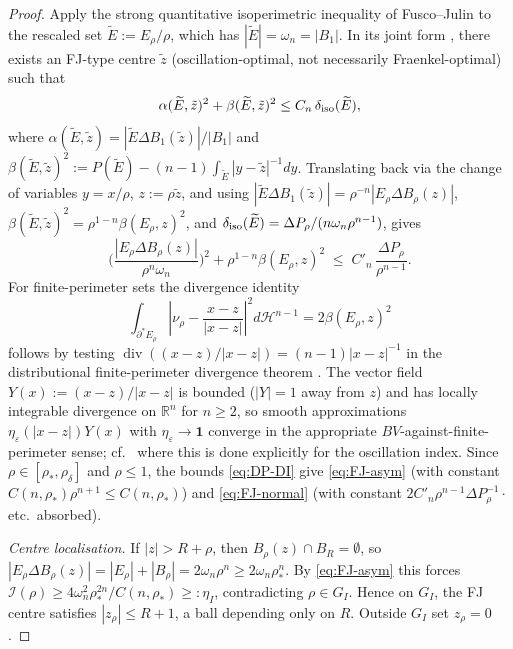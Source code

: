 \documentclass[11pt]{article}
\theoremstyle{definition}
\newcommand{\R}{\mathbb{R}}
\newcommand{\eps}{\varepsilon}
\newcommand{\rstar}{\rho_{*}}
\begin{document}
\begin{proof}
Apply the strong quantitative isoperimetric inequality of Fusco--Julin
\cite{FJ2014} to the rescaled set $\widetilde E:=E_\rho/\rho$, which
has $|\widetilde E|=\omega_n=|B_1|$.  In its joint form \cite[Thm.~1.1]{FJ2014},
there exists an FJ-type centre $\tilde z$ (oscillation-optimal, not
necessarily Fraenkel-optimal) such that
\[
   \alpha(\widetilde E,\tilde z)^2+\beta(\widetilde E,\tilde z)^2
   \le C_n\,\delta_{\rm iso}(\widetilde E),
\]
where $\alpha(\widetilde E,\tilde z)=|\widetilde E\Delta B_1(\tilde z)|/|B_1|$ and
$\beta(\widetilde E,\tilde z)^2:=P(\widetilde E)-(n-1)\int_{\widetilde E}|y-\tilde z|^{-1}dy$.
Translating back via the change of variables $y=x/\rho$, $z:=\rho\tilde z$,
and using $|\widetilde E\Delta B_1(\tilde z)|=\rho^{-n}|E_\rho\Delta B_\rho(z)|$,
$\beta(\widetilde E,\tilde z)^2=\rho^{1-n}\beta(E_\rho,z)^2$, and
$\delta_{\rm iso}(\widetilde E)=\Delta P_\rho/(n\omega_n\rho^{n-1})$, gives
\[
   \biggl(\frac{|E_\rho\Delta B_\rho(z)|}{\rho^n\omega_n}\biggr)^{\!2}
   +\rho^{1-n}\beta(E_\rho,z)^2
   \;\le\;C'_n\,\frac{\Delta P_\rho}{\rho^{n-1}}.
\]
For finite-perimeter sets the divergence identity
\[
   \int_{\partial^*E_\rho}
      \left|\nu_\rho-\frac{x-z}{|x-z|}\right|^2d\mathcal H^{n-1}
   =2\beta(E_\rho,z)^2
\]
follows by testing $\operatorname{div}((x-z)/|x-z|)=(n-1)|x-z|^{-1}$ in
the distributional finite-perimeter divergence theorem
\cite[Thm.~17.6 and Cor.~17.9]{Maggi2012}.  The vector field
$Y(x):=(x-z)/|x-z|$ is bounded ($|Y|=1$ away from $z$) and has locally
integrable divergence on $\R^n$ for $n\ge 2$, so smooth approximations
$\eta_\eps(|x-z|)Y(x)$ with $\eta_\eps\to\mathbf 1$ converge in the
appropriate $BV$-against-finite-perimeter sense; cf.\
\cite[Lemma~1.2]{FJ2014} where this is done explicitly for the
oscillation index.
Since $\rho\in[\rstar,\rho_\delta]$ and $\rho\le 1$, the bounds
\eqref{eq:DP-DI} give \eqref{eq:FJ-asym} (with constant
$C(n,\rstar)\rho^{n+1}\le C(n,\rstar)$) and \eqref{eq:FJ-normal} (with
constant $2C'_n\rho^{n-1}\Delta P_\rho^{-1}\cdot$ etc.\ absorbed).

\emph{Centre localisation.}  If $|z|>R+\rho$, then
$B_\rho(z)\cap B_R=\emptyset$, so $|E_\rho\Delta B_\rho(z)|=|E_\rho|+|B_\rho|
=2\omega_n\rho^n\ge 2\omega_n\rstar^n$.  By \eqref{eq:FJ-asym} this
forces $\mathcal I(\rho)\ge 4\omega_n^2\rstar^{2n}/C(n,\rstar)\ge:\eta_I$,
contradicting $\rho\in G_I$.  Hence on $G_I$, the FJ centre satisfies
$|z_\rho|\le R+1$, a ball depending only on $R$.  Outside $G_I$ set
$z_\rho=0$.


\end{proof}
\end{document}
